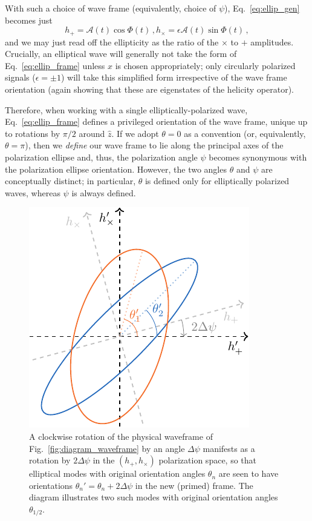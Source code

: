 \documentclass[aps,prd,twocolumn,superscriptaddress,preprintnumbers,floatfix,nofootinbib]{revtex4-2}
\newcommand{\beq}{\begin{equation}}
\newcommand{\eeq}{\end{equation}}
\newcommand*{\eq}[1]{Eq.~\eqref{eq:#1}}
\begin{document}
With such a choice of wave frame (equivalently, choice of $\psi$), \eq{ellip_gen} becomes just
\begin{subequations} \label{eq:ellip_frame}
\beq
h_+ = \mathcal{A}(t) \cos \Phi(t) \, ,
\eeq
\beq
h_\times = \epsilon \mathcal{A}(t) \sin \Phi(t)\, ,
\eeq
\end{subequations}
and we may just read off the ellipticity as the ratio of the $\times$ to $+$ amplitudes.
Crucially, an elliptical wave will generally not take the form of Eq.~\eqref{eq:ellip_frame} unless $\hat{x}$ is chosen appropriately; only circularly polarized signals ($\epsilon=\pm1$) will take  this simplified form irrespective of the wave frame orientation (again showing that these are eigenstates of the helicity operator).

Therefore, when working with a single elliptically-polarized wave, Eq.~\eqref{eq:ellip_frame} defines a privileged orientation of the wave frame, unique up to rotations by $\pi/2$ around $\hat{z}$.
If we adopt $\theta =0$ as a convention (or, equivalently, $\theta=\pi$), then we \emph{define} our wave frame to lie along the principal axes of the polarization ellipse and, thus, the polarization angle $\psi$ becomes synonymous with the polarization ellipse orientation.
However, the two angles $\theta$ and $\psi$ are conceptually distinct; in particular, $\theta$ is defined only for elliptically polarized waves, whereas $\psi$ is always defined.


\begin{figure}
\includegraphics[width=0.7\columnwidth]{diagram_ellipse_extra.pdf}
\caption{A clockwise rotation of the physical waveframe of Fig.~\ref{fig:diagram_waveframe} by an angle $\Delta\psi$ manifests as a rotation by $2\Delta\psi$ in the $(h_+,h_\times)$ polarization space, so that elliptical modes with original orientation angles $\theta_n$ are seen to have orientations $\theta_n'=\theta_n + 2\Delta\psi$ in the new (primed) frame.
The diagram illustrates two such modes with original orientation angles $\theta_{1/2}$.
}
\label{fig:diagram_ellipse_extra}
\end{figure}
\end{document}
